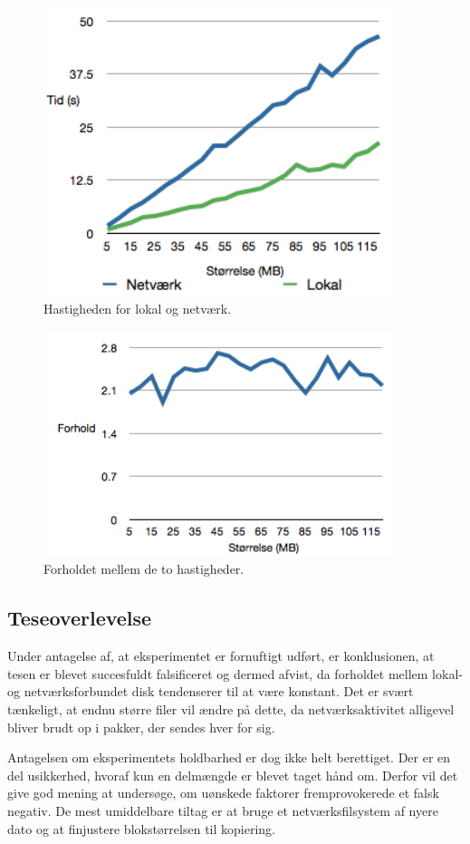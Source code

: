 \documentclass{article}
\begin{document}
\begin{figure}
	\includegraphics[width=4in]{ploto.png}
	\caption{Hastigheden for lokal og netværk.}
	\label{ploto}
\end{figure}

\begin{figure}
	\includegraphics[width=4in]{plotforhold.png}
	\caption{Forholdet mellem de to hastigheder.}
	\label{plotforhold}
\end{figure}

\subsection{Teseoverlevelse}
Under antagelse af, at eksperimentet er fornuftigt udført, er konklusionen, at tesen er blevet succesfuldt falsificeret og dermed afvist, da forholdet mellem lokal- og netværksforbundet disk tendenserer til at være konstant. Det er svært tænkeligt, at endnu større filer vil ændre på dette, da netværksaktivitet alligevel bliver brudt op i pakker, der sendes hver for sig.

Antagelsen om eksperimentets holdbarhed er dog ikke helt berettiget. Der er en del usikkerhed, hvoraf kun en delmængde er blevet taget hånd om. Derfor vil det give god mening at undersøge, om uønskede faktorer fremprovokerede et falsk negativ. De mest umiddelbare tiltag er at bruge et netværksfilsystem af nyere dato og at finjustere blokstørrelsen til kopiering.
\end{document}
